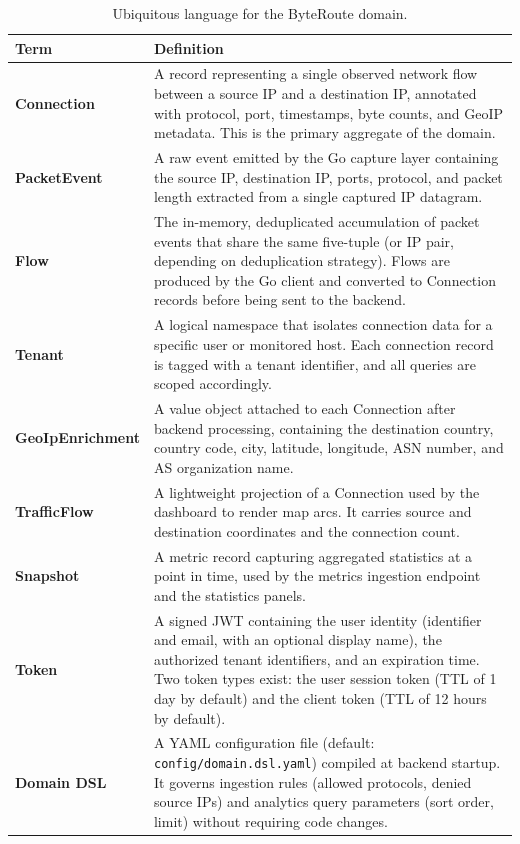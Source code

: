 \documentclass[12pt]{report}
\begin{document}
\begin{table}[htbp]
  \centering
  \small
  \setlength{\tabcolsep}{4pt}
  \renewcommand{\arraystretch}{0.95}
  \caption{Ubiquitous language for the ByteRoute domain.}
  \label{tab:ubiquitous}
  \begin{tabularx}{\textwidth}{p{}X}
    \toprule
    \textbf{Term} & \textbf{Definition} \\
    \midrule
    \textbf{Connection} &
      A record representing a single observed network flow between a source IP
      and a destination IP, annotated with protocol, port, timestamps, byte
      counts, and GeoIP metadata. This is the primary aggregate of the
      domain. \\
    \addlinespace
    \textbf{PacketEvent} &
      A raw event emitted by the Go capture layer containing the source IP,
      destination IP, ports, protocol, and packet length extracted from a
      single captured IP datagram. \\
    \addlinespace
    \textbf{Flow} &
      The in-memory, deduplicated accumulation of packet events that share the
      same five-tuple (or IP pair, depending on deduplication strategy). Flows
      are produced by the Go client and converted to Connection records before
      being sent to the backend. \\
    \addlinespace
    \textbf{Tenant} &
      A logical namespace that isolates connection data for a specific user or
      monitored host. Each connection record is tagged with a tenant identifier,
      and all queries are scoped accordingly. \\
    \addlinespace
    \textbf{GeoIpEnrichment} &
      A value object attached to each Connection after backend processing,
      containing the destination country, country code, city, latitude,
      longitude, ASN number, and AS organization name. \\
    \addlinespace
    \textbf{TrafficFlow} &
      A lightweight projection of a Connection used by the dashboard to render
      map arcs. It carries source and destination coordinates and the connection
      count. \\
    \addlinespace
    \textbf{Snapshot} &
      A metric record capturing aggregated statistics at a point in time, used
      by the metrics ingestion endpoint and the statistics panels. \\
    \addlinespace
    \textbf{Token} &
      A signed JWT containing the user identity (identifier and email, with an
      optional display name), the authorized tenant identifiers, and an
      expiration time. Two token types exist: the user session token (TTL of 1
      day by default) and the client token (TTL of 12 hours by default). \\
    \addlinespace
    \textbf{Domain DSL} &
      A YAML configuration file (default: \texttt{config/domain.dsl.yaml})
      compiled at backend startup. It governs ingestion rules (allowed
      protocols, denied source IPs) and analytics query parameters (sort order,
      limit) without requiring code changes. \\
    \bottomrule
  \end{tabularx}
\end{table}
\end{document}
